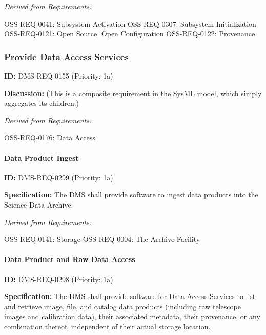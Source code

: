 \documentclass[SE,toc,lsstdraft]{lsstdoc}
\begin{document}
\emph{Derived from Requirements:}

OSS-REQ-0041:
Subsystem Activation \newline
OSS-REQ-0307:
Subsystem Initialization \newline
OSS-REQ-0121:
Open Source, Open Configuration \newline
OSS-REQ-0122:
Provenance \newline

\subsubsection{Provide Data Access Services}

\label{DMS-REQ-0155}
\textbf{ID:} DMS-REQ-0155 (Priority: 1a)

\textbf{Discussion:}
    (This is a composite requirement in the SysML model, which simply aggregates its children.)

\emph{Derived from Requirements:}

OSS-REQ-0176:
Data Access \newline

\paragraph{Data Product Ingest}\hfill  %

\label{DMS-REQ-0299}
\textbf{ID:} DMS-REQ-0299 (Priority: 1a)

\textbf{Specification:} The DMS shall provide software to ingest data products into the Science Data Archive.

\emph{Derived from Requirements:}

OSS-REQ-0141:
Storage \newline
OSS-REQ-0004:
The Archive Facility \newline

\paragraph{Data Product and Raw Data Access}\hfill  %

\label{DMS-REQ-0298}
\textbf{ID:} DMS-REQ-0298 (Priority: 1a)

\textbf{Specification:} The DMS shall provide software for Data Access Services to list and retrieve image, file, and catalog data products (including raw telescope images and calibration data), their associated metadata, their provenance, or any combination thereof, independent of their actual storage location.
\end{document}
